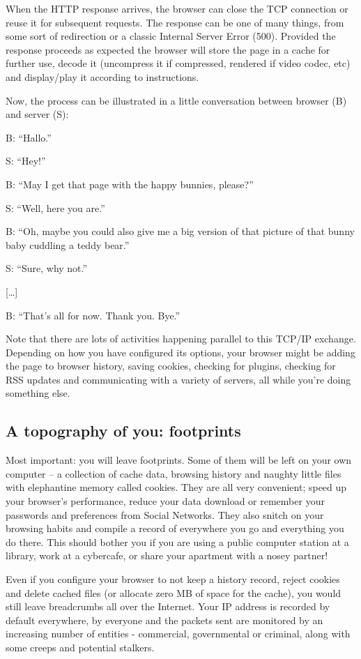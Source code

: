 When the HTTP response arrives, the browser can close the TCP connection
or reuse it for subsequent requests. The response can be one of many
things, from some sort of redirection or a classic Internal Server Error
(500). Provided the response proceeds as expected the browser will store
the page in a cache for further use, decode it (uncompress it if
compressed, rendered if video codec, etc) and display/play it according
to instructions.

Now, the process can be illustrated in a little conversation between
browser (B) and server (S):

B: ``Hallo.''

S: ``Hey!''

B: ``May I get that page with the happy bunnies, please?''

S: ``Well, here you are.''

B: ``Oh, maybe you could also give me a big version of that picture of
that bunny baby cuddling a teddy bear.''

S: ``Sure, why not.''

{[}\ldots{}{]}

B: ``That's all for now. Thank you. Bye.''

Note that there are lots of activities happening parallel to this TCP/IP
exchange. Depending on how you have configured its options, your browser
might be adding the page to browser history, saving cookies, checking
for plugins, checking for RSS updates and communicating with a variety
of servers, all while you're doing something else.

\subsection{A topography of you: footprints}

Most important: you will leave footprints. Some of them will be left on
your own computer -- a collection of cache data, browsing history and
naughty little files with elephantine memory called cookies. They are
all very convenient; speed up your browser's performance, reduce your
data download or remember your passwords and preferences from Social
Networks. They also snitch on your browsing habits and compile a record
of everywhere you go and everything you do there. This should bother you
if you are using a public computer station at a library, work at a
cybercafe, or share your apartment with a nosey partner!

Even if you configure your browser to not keep a history record, reject
cookies and delete cached files (or allocate zero MB of space for the
cache), you would still leave breadcrumbs all over the Internet. Your IP
address is recorded by default everywhere, by everyone and the packets
sent are monitored by an increasing number of entities - commercial,
governmental or criminal, along with some creeps and potential stalkers.

